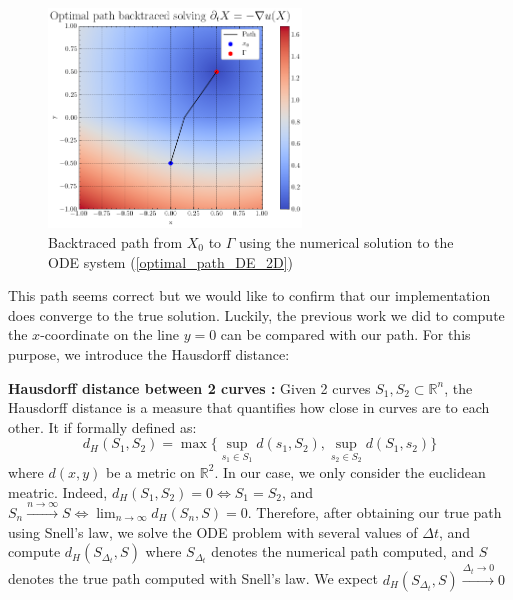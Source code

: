 \documentclass[11pt]{article}
\theoremstyle{definition}
\theoremstyle{remark}
\newcommand{\R}{\mathbb{R}}
\begin{document}
\begin{figure}[h]
  \centering
  \includegraphics[width=0.6\textwidth]{plots/snell_path.png}
  \caption{Backtraced path from $X_0$ to $\Gamma$ using the numerical solution to the ODE system (\ref{optimal_path_DE_2D})}
  \label{fig:snell_path}
\end{figure}

\noindent This path seems correct but we would like to confirm that our implementation does converge to the true solution. Luckily, the previous work we did to compute the $x$-coordinate on the line $y=0$ can be compared with our path. For this purpose, we introduce the Hausdorff distance: \\

\vspace{5pt}

\noindent\textbf{Hausdorff distance between 2 curves :} Given 2 curves $S_1,S_2\subset \mathbb{R}^n$, the Hausdorff distance is a measure that quantifies how close in curves are to each other. It if formally defined as:
\begin{equation*}
    d_H(S_1,S_2)=\max\{\sup_{s_1\in S_1}d(s_1,S_2),\sup_{s_2\in S_2}d(S_1,s_2)\}
\end{equation*}
where $d(x,y)$ be a metric on $\R^2$. In our case, we only consider the euclidean meatric. Indeed, $d_H(S_1,S_2)=0\iff S_1=S_2$, and $S_n\xrightarrow{n\to\infty}S\iff\lim_{n\to\infty}d_H(S_n,S)=0$.
Therefore, after obtaining our true path using Snell's law, we solve the ODE problem with several values of $\Delta t$, and compute $d_H(S_{\Delta_t},S)$ where $S_{\Delta_t}$ denotes the numerical path computed, and $S$ denotes the true path computed with Snell's law. We expect $d_H(S_{\Delta_t},S)\xrightarrow{\Delta_t\to0}0$
\end{document}
